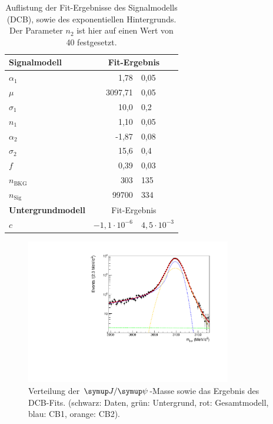 %
\begin{table}[H]
  \centering
  \caption{Auflistung der Fit-Ergebnisse des Signalmodells (DCB), sowie des exponentiellen Hintergrunds. Der Parameter $n_2$ ist hier auf einen Wert von 40 festgesetzt.}
  \begin{tabular}{lr@{$\,\pm\,$}l}
    \toprule
    \textbf{Signalmodell}         &  \multicolumn{2}{c}{Fit-Ergebnis} \\
    \midrule
    \quad$\alpha_1$               & 1,78    & 0,05 \\
    \quad$\mu$                    & 3097,71 & 0,05 \\
    \quad$\sigma_1$               & 10,0    & 0,2 \\
    \quad$n_1$                    & 1,10    & 0,05 \\
    \quad$\alpha_2$               & -1,87   & 0,08 \\
    \quad$\sigma_2$               & 15,6    & 0,4 \\
    \quad$f$                      & 0,39    & 0,03 \\
    \quad$n_\text{BKG}$           & 303     & 135 \\
    \quad$n_\text{Sig}$           & 99700   & 334 \\
    \midrule
    \textbf{Untergrundmodell}     &  \multicolumn{2}{c}{Fit-Ergebnis} \\
    \midrule
    \quad$c$                      & $-1,1\cdot10^{-6}$   & $4,5\cdot10^{-3}$ \\
    \bottomrule
  \end{tabular}
  \label{tab:fit1}
\end{table}
%
\begin{figure}[H]
  \centering
      \includegraphics[width=0.8\textwidth]{Plots/DCBexp.pdf}
  \caption{Verteilung der $\jpsi$-Masse sowie das Ergebnis des DCB-Fits. (schwarz: Daten, grün: Untergrund, rot: Gesamtmodell, blau: CB1, orange: CB2).}
  \label{fig:fit1}
\end{figure}

